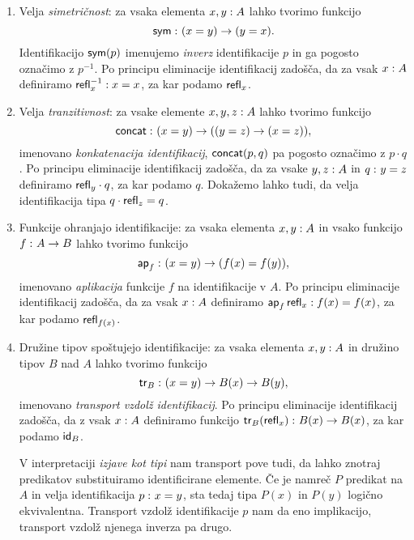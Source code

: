 \begin{enumerate}
\item Velja \emph{simetričnost}: za vsaka elementa \({x, y : A}\) lahko tvorimo
  funkcijo \[\textnormal{\textsf{sym}} \,\colon (x = y) \to (y = x).\] Identifikacijo \(\textnormal{\textsf{sym}}(p)\)
  imenujemo \emph{inverz} identifikacije \(p\) in ga pogosto označimo z \(p^{-1}\).
  Po principu eliminacije identifikacij zadošča, da za vsak \({x : A}\) definiramo \({\textnormal{\textsf{refl}}_{x}^{-1} : x = x}\), za kar podamo \(\textnormal{\textsf{refl}}_{x}\).
\item Velja \emph{tranzitivnost}: za vsake elemente \({x, y, z : A}\) lahko tvorimo
  funkcijo  \[\textnormal{\textsf{concat}} \,\colon (x = y) \to ((y = z) \to (x = z)),\] imenovano
  \emph{konkatenacija identifikacij}, \(\textnormal{\textsf{concat}}(p, q)\) pa pogosto označimo
  z \(p \cdot q\). Po principu eliminacije identifikacij zadošča, da za vsake \({y, z : A}\) in \(q \,\colon y = z\) definiramo \(\textnormal{\textsf{refl}}_{y}\cdot q\), za kar podamo \(q\). Dokažemo lahko tudi, da velja identifikacija tipa \(q \cdot \textnormal{\textsf{refl}}_{z} = q\).
\item Funkcije ohranjajo identifikacije: za vsaka elementa \({x, y : A}\)
  in vsako funkcijo \(f \,\colon A \to B\) lahko tvorimo funkcijo
  \[\textnormal{\textsf{ap}}_{f} \,\colon (x = y) \to (f(x) = f(y)),\]
  imenovano \emph{aplikacija} funkcije \(f\) na identifikacije v \(A\). Po principu eliminacije identifikacij zadošča, da za vsak \({x : A}\) definiramo
  \({\textnormal{\textsf{ap}}_{f}\,\textnormal{\textsf{refl}}_{x} : f(x) = f(x)}\), za kar podamo \(\textnormal{\textsf{refl}}_{f(x)}\).
\item Družine tipov spoštujejo identifikacije: za vsaka elementa
  \({x, y : A}\) in družino tipov
  \(B\) nad \(A\) lahko tvorimo funkcijo
  \[\textnormal{\textsf{tr}}_{B} \,\colon (x = y) \to B(x) \to B(y),\]
  imenovano \emph{transport vzdolž identifikacij}.
  Po principu eliminacije identifikacij zadošča, da z vsak \({x : A}\) definiramo funkcijo \(\textnormal{\textsf{tr}}_{B}(\textnormal{\textsf{refl}}_{x}) \,\colon B(x) \to B(x)\), za kar podamo \(\textnormal{\textsf{id}}_{B}\).

  V interpretaciji \emph{izjave kot tipi} nam transport pove tudi, da lahko znotraj
  predikatov substituiramo identificirane elemente. Če je namreč \(P\) predikat
  na \(A\) in velja identifikacija \(p \,\colon x = y\), sta tedaj tipa \(P(x)\) in \(P(y)\) logično ekvivalentna. Transport vzdolž identifikacije \(p\) nam da eno implikacijo, transport vzdolž njenega inverza pa drugo.
\end{enumerate}

